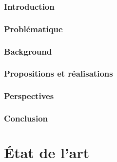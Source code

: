 \documentclass[french, 12pt]{article} %
\begin{document}
	\section{Introduction}
	 
	
	\newpage
	\section{Problématique}
	
	
	\newpage
	\section{Background}
	
	
	
	\newpage
	\section{Propositions et réalisations}
	
	
	
	
	\newpage
	\section{Perspectives}
	
	
	\newpage
	\section{Conclusion}
	
	
	\newpage
	\printglossaries

	\newpage
	

\newpage
	\part{État de l'art} \appendix	
	
	
	
	
	
\end{document}
